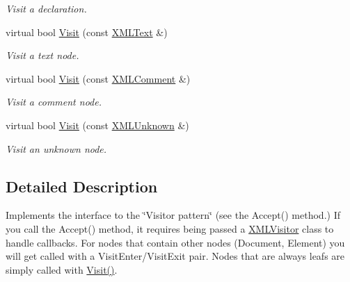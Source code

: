\begin{DoxyCompactItemize}
\begin{DoxyCompactList}\small\item\em Visit a declaration. \end{DoxyCompactList}\item 
virtual bool \hyperlink{classtinyxml2_1_1XMLVisitor_af30233565856480ea48b6fa0d6dec65b}{Visit} (const \hyperlink{classtinyxml2_1_1XMLText}{X\+M\+L\+Text} \&)\hypertarget{classtinyxml2_1_1XMLVisitor_af30233565856480ea48b6fa0d6dec65b}{}\label{classtinyxml2_1_1XMLVisitor_af30233565856480ea48b6fa0d6dec65b}

\begin{DoxyCompactList}\small\item\em Visit a text node. \end{DoxyCompactList}\item 
virtual bool \hyperlink{classtinyxml2_1_1XMLVisitor_acc8147fb5a85f6c65721654e427752d7}{Visit} (const \hyperlink{classtinyxml2_1_1XMLComment}{X\+M\+L\+Comment} \&)\hypertarget{classtinyxml2_1_1XMLVisitor_acc8147fb5a85f6c65721654e427752d7}{}\label{classtinyxml2_1_1XMLVisitor_acc8147fb5a85f6c65721654e427752d7}

\begin{DoxyCompactList}\small\item\em Visit a comment node. \end{DoxyCompactList}\item 
virtual bool \hyperlink{classtinyxml2_1_1XMLVisitor_a14e4748387c34bf53d24e8119bb1f292}{Visit} (const \hyperlink{classtinyxml2_1_1XMLUnknown}{X\+M\+L\+Unknown} \&)\hypertarget{classtinyxml2_1_1XMLVisitor_a14e4748387c34bf53d24e8119bb1f292}{}\label{classtinyxml2_1_1XMLVisitor_a14e4748387c34bf53d24e8119bb1f292}

\begin{DoxyCompactList}\small\item\em Visit an unknown node. \end{DoxyCompactList}\end{DoxyCompactItemize}


\subsection{Detailed Description}
Implements the interface to the \char`\"{}\+Visitor pattern\char`\"{} (see the Accept() method.) If you call the Accept() method, it requires being passed a \hyperlink{classtinyxml2_1_1XMLVisitor}{X\+M\+L\+Visitor} class to handle callbacks. For nodes that contain other nodes (Document, Element) you will get called with a Visit\+Enter/\+Visit\+Exit pair. Nodes that are always leafs are simply called with \hyperlink{classtinyxml2_1_1XMLVisitor_adc75bd459fc7ba8223b50f0616767f9a}{Visit()}.

